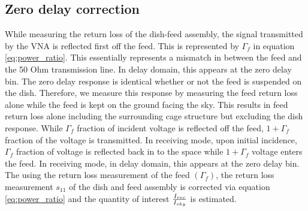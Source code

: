 \documentclass[twocolumn]{emulateapj}
\begin{document}
\subsection{\textbf{Zero delay correction}}

While measuring the return loss of the dish-feed assembly, the signal transmitted by the VNA is reflected first off the feed. This is represented by $\Gamma_{f}$ in equation \ref{eq:power_ratio}. This essentially represents a mismatch in between the feed and the 50 Ohm transmission line. In delay domain, this appears at the zero delay bin. The zero delay response is identical whether or not the feed is suspended on the dish. Therefore, we measure this response by measuring the feed return loss alone while the feed is kept on the ground facing the sky. This results in feed return loss alone including the surrounding cage structure but excluding the dish response. While $\Gamma_{f}$ fraction of incident voltage is reflected off the feed, $1+\Gamma_{f}$ fraction of the voltage is transmitted. In receiving mode, upon initial incidence, $\Gamma_{f}$ fraction of voltage is reflected back in to the space while $1+\Gamma_{f}$ voltage enters the feed. In receiving mode, in delay domain, this appears at the zero delay bin.
The using the return loss measurement of the feed $(\Gamma_{f})$, the return loss measurement $s_{11}$ of the dish and feed assembly is corrected via equation \ref{eq:power_ratio} and the quantity of interest ${I_{rec}\over I_{sky}}$ is estimated. 
\end{document}
